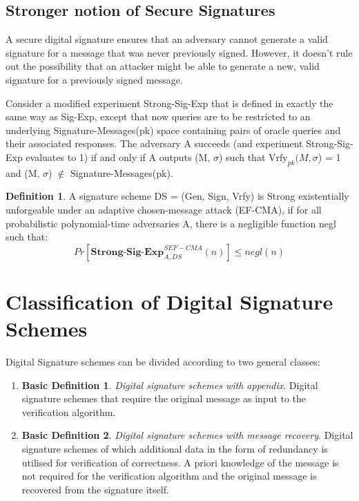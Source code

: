 \documentclass[]{final_report}
\theoremstyle{definition}
\newtheorem{definition}{Definition}[chapter]
\newtheorem{basic}{Basic Definition}
\begin{document}
\subsection{Stronger notion of Secure Signatures}
A secure digital signature ensures that an adversary cannot generate a valid signature for a message that was never previously signed. However, it doesn't rule out the possibility that an attacker might be able to generate a new, valid signature for a previously signed message.

Consider a modified experiment Strong-Sig-Exp that is defined in exactly the same way as Sig-Exp, except that now queries are to be restricted to an underlying Signature-Messages(pk) space containing pairs of oracle queries and their associated responses.  The adversary A succeeds (and experiment Strong-Sig-Exp evaluates to 1) if and only if A outputs (M, $\sigma$) such that $\text{Vrfy}_{pk} (M, \sigma$) = 1 and (M, $\sigma$) $\notin$ Signature-Messages(pk).
 \begin{definition}
A signature scheme DS = (Gen, Sign, Vrfy) is Strong existentially unforgeable under an adaptive chosen-message attack (EF-CMA), if for all probabilistic polynomial-time adversaries A, there is a negligible function negl such that:
\[ Pr[\textbf{Strong-Sig-Exp}_{A,DS}^{SEF-CMA}(n)] \leq negl(n) \]

\end{definition}



\section{Classification of Digital Signature Schemes}
Digital Signature schemes can be divided according to two general classes:
\begin{enumerate}
    \item \begin{basic} 
\textit{Digital signature schemes with appendix}. Digital signature schemes that require the original message as input to the verification algorithm.
\end{basic}
    \item \begin{basic}
\textit{Digital signature schemes with message recovery}. Digital signature schemes of which additional data in the form of redundancy is utilised for verification of correctness. A priori knowledge of the message is not required for the verification algorithm and the original message is recovered from the signature itself.
\end{basic}

\end{enumerate}
\end{document}
